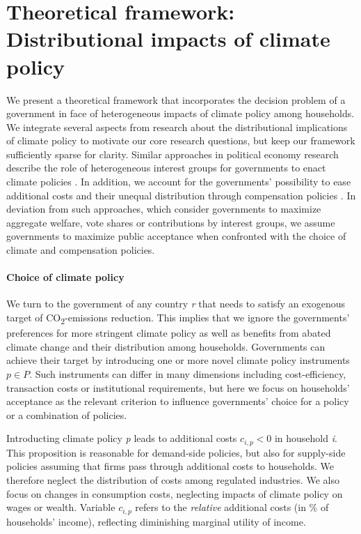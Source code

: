 \documentclass[12pt, a4paper]{article}
\begin{document}
\section{Theoretical framework: Distributional impacts of climate policy} \label{sec:literature}

We present a theoretical framework that incorporates the decision problem of a government in face of heterogeneous impacts of climate policy among households. We integrate several aspects from research about the distributional implications of climate policy to motivate our core research questions, but keep our framework sufficiently sparse for clarity. Similar approaches in political economy research describe the role of heterogeneous interest groups for governments to enact climate policies \autocite{Aidt.1998,Fredriksson.1997}. In addition, we account for the governments' possibility to ease additional costs and their unequal distribution through compensation policies \autocite{Lindbeck.1987,Aidt.1998,Cremer.2004}. In deviation from such approaches, which consider governments to maximize aggregate welfare, vote shares or contributions by interest groups, we assume governments to maximize public acceptance \autocite[e.g.,][]{Downs.1957,Stigler.1971} when confronted with the choice of climate and compensation policies. 

\paragraph{Choice of climate policy} 
We turn to the government of any country \textit{r} that needs to satisfy an exogenous target of CO\textsubscript{2}-emissions reduction. This implies that we ignore the governments' preferences for more stringent climate policy as well as benefits from abated climate change and their distribution among households. Governments can achieve their target by introducing one or more novel climate policy instruments $p \in P$. Such instruments can differ in many dimensions including cost-efficiency, transaction costs or institutional requirements, but here we focus on households' acceptance as the relevant criterion to influence governments' choice for a policy or a combination of policies.

Introducting climate policy \textit{p} leads to additional costs $c_{i,p}<0$ in household \textit{i}. This proposition is reasonable for demand-side policies, but also for supply-side policies assuming that firms pass through additional costs to households. We therefore neglect the distribution of costs among regulated industries. We also focus on changes in consumption costs, neglecting impacts of climate policy on wages or wealth. Variable $c_{i,p}$ refers to the \textit{relative} additional costs (in \% of households' income), reflecting diminishing marginal utility of income.
\end{document}
